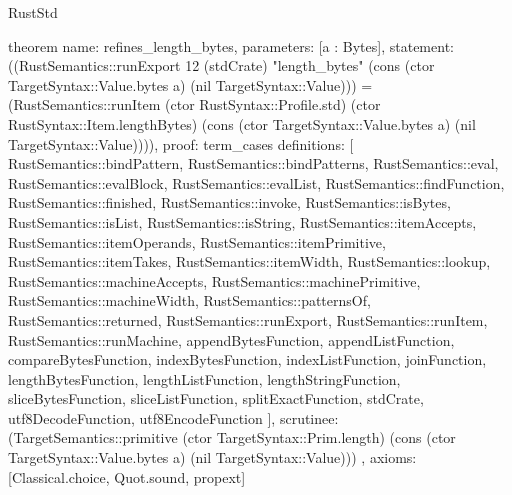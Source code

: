 \begin{lexlean}{RustStd}
\begin{semanticmodule}
theorem{
  name: refines_length_bytes,
  parameters: [a : Bytes],
  statement: ((RustSemantics::runExport 12 (stdCrate) "length_bytes" (cons (ctor TargetSyntax::Value.bytes a) (nil TargetSyntax::Value))) = (RustSemantics::runItem (ctor RustSyntax::Profile.std) (ctor RustSyntax::Item.lengthBytes) (cons (ctor TargetSyntax::Value.bytes a) (nil TargetSyntax::Value)))),
  proof: term_cases{
    definitions: [
      RustSemantics::bindPattern,
      RustSemantics::bindPatterns,
      RustSemantics::eval,
      RustSemantics::evalBlock,
      RustSemantics::evalList,
      RustSemantics::findFunction,
      RustSemantics::finished,
      RustSemantics::invoke,
      RustSemantics::isBytes,
      RustSemantics::isList,
      RustSemantics::isString,
      RustSemantics::itemAccepts,
      RustSemantics::itemOperands,
      RustSemantics::itemPrimitive,
      RustSemantics::itemTakes,
      RustSemantics::itemWidth,
      RustSemantics::lookup,
      RustSemantics::machineAccepts,
      RustSemantics::machinePrimitive,
      RustSemantics::machineWidth,
      RustSemantics::patternsOf,
      RustSemantics::returned,
      RustSemantics::runExport,
      RustSemantics::runItem,
      RustSemantics::runMachine,
      appendBytesFunction,
      appendListFunction,
      compareBytesFunction,
      indexBytesFunction,
      indexListFunction,
      joinFunction,
      lengthBytesFunction,
      lengthListFunction,
      lengthStringFunction,
      sliceBytesFunction,
      sliceListFunction,
      splitExactFunction,
      stdCrate,
      utf8DecodeFunction,
      utf8EncodeFunction
    ],
    scrutinee: (TargetSemantics::primitive (ctor TargetSyntax::Prim.length) (cons (ctor TargetSyntax::Value.bytes a) (nil TargetSyntax::Value)))
  },
  axioms: [Classical.choice, Quot.sound, propext]
}


\end{semanticmodule}
\end{lexlean}

